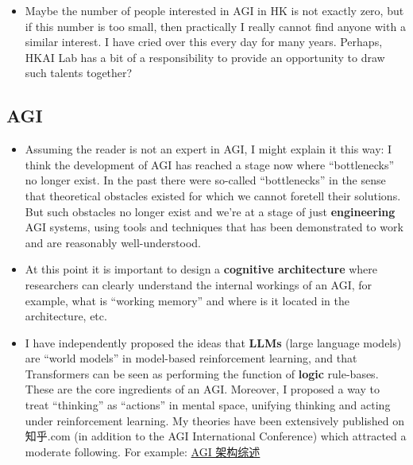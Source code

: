 \begin{preview}
\begin{minipage}{\textwidth}
\begin{itemize}
	\item Maybe the number of people interested in AGI in HK is not exactly zero, but if this number is too small, then practically I really cannot find anyone with a similar interest.  I have cried over this every day for many years.  Perhaps, HKAI Lab has a bit of a responsibility to provide an opportunity to draw such talents together?
	
\end{itemize}
\end{minipage}
\end{preview}

\begin{preview}
\begin{minipage}{\textwidth}
	\setlength{\parskip}{0.4\baselineskip}

\section{AGI}

\begin{itemize}
	
	\item Assuming the reader is not an expert in AGI, I might explain it this way:  I think the development of AGI has reached a stage now where ``bottlenecks'' no longer exist.  In the past there were so-called ``bottlenecks'' in the sense that theoretical obstacles existed for which we cannot foretell their solutions.  But such obstacles no longer exist and we're at a stage of just \textbf{engineering} AGI systems, using tools and techniques that has been demonstrated to work and are reasonably well-understood.

	\item At this point it is important to design a \textbf{cognitive architecture} where researchers can clearly understand the internal workings of an AGI, for example, what is ``working memory'' and where is it located in the architecture, etc.
	
	\item I have independently proposed the ideas that \textbf{LLMs} (large language models) are ``world models'' in model-based reinforcement learning, and that Transformers can be seen as performing the function of \textbf{logic} rule-bases.  These are the core ingredients of an AGI.  Moreover, I proposed a way to treat ``thinking'' as ``actions'' in mental space, unifying thinking and acting under reinforcement learning.  My theories have been extensively published on 知乎.com (in addition to the AGI International Conference) which attracted a moderate following.  For example:  \href{https://zhuanlan.zhihu.com/p/615327294}{AGI 架构综述}
	

\end{itemize}
\end{minipage}
\end{preview}
